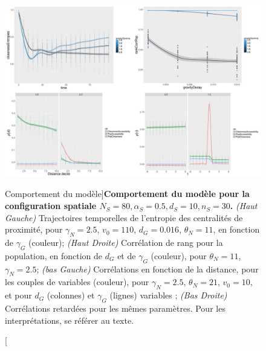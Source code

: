 \begin{figure}
	\includegraphics[width=\linewidth]{Figures/Final/6-1-3-fig-macrocoevolexplo-behavior.jpg}
	\caption[Model Behavior][Comportement du modèle]{}{\textbf{Comportement du modèle pour la configuration spatiale $N_S=80,\alpha_S=0.5,d_S=10,n_S=30$.} \textit{(Haut Gauche)} Trajectoires temporelles de l'entropie des centralités de proximité, pour $\gamma_N = 2.5$, $v_0 = 110$, $d_G = 0.016$, $\theta_N = 11$, en fonction de $\gamma_G$ (couleur); \textit{(Haut Droite)} Corrélation de rang pour la population, en fonction de $d_G$ et de $\gamma_G$ (couleur), pour $\theta_N = 11$, $\gamma_N = 2.5$; \textit{(bas Gauche)} Corrélations en fonction de la distance, pour les couples de variables (couleur), pour $\gamma_N = 2.5$, $\theta_N = 21$, $v_0 = 10$, et pour $d_G$ (colonnes) et $\gamma_G$ (lignes) variables ; \textit{(Bas Droite)} Corrélations retardées pour les mêmes paramètres. Pour les interprétations, se référer au texte.\label{fig:macrocoevolexplo:behavior}}
\end{figure}











\stars

















